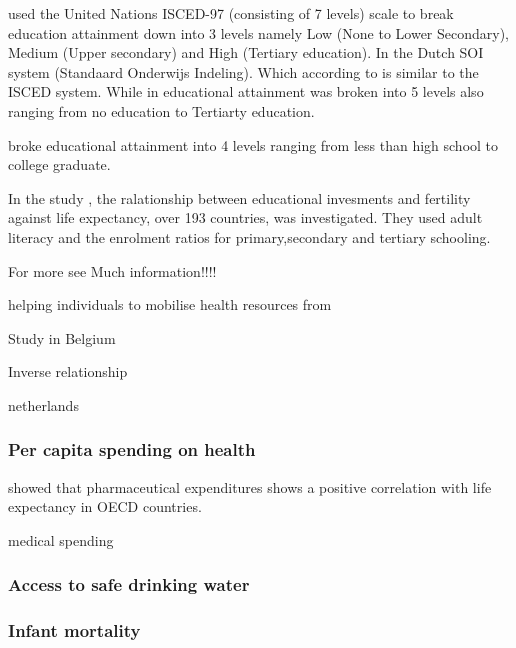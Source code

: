 \documentclass[10pt,a4paper]{article}
\begin{document}
\cite{Luy2019} used the United Nations ISCED-97 (consisting of 7 levels) scale to break education attainment down into 3 levels namely Low (None to Lower Secondary), Medium (Upper secondary) and High (Tertiary education). In \cite{VanKippersluis2009} the Dutch SOI system (Standaard Onderwijs Indeling). Which according to \cite{VanKippersluis2009} is similar to the ISCED system. While in \cite{Deboosere2009} educational attainment was broken into 5 levels also ranging from no education to Tertiarty education. 

\cite{Kaplan2015} broke educational attainment into 4 levels ranging from less than high school to college graduate.

In the study \cite{Bulled2010}, the ralationship between educational invesments and fertility against life expectancy, over 193 countries, was investigated. They used adult literacy and the enrolment ratios for primary,secondary and tertiary schooling.


For more see \cite{Montez2015} Much information!!!!









helping individuals to mobilise health resources \cite{Elo1996} from \cite{Deboosere2009}





Study in Belgium \cite{Deboosere2009}


Inverse relationship  \cite{Hoque2019}

netherlands \cite{VanKippersluis2009}

\cite{VanBaal2016a}

\subsubsection{Per capita spending on health}

\cite{Shaw2005} showed that pharmaceutical expenditures shows a positive correlation with life expectancy in OECD countries.

medical spending \cite{Cutler2006}

\subsubsection{Access to safe drinking water}

\subsubsection{Infant mortality}
\end{document}
